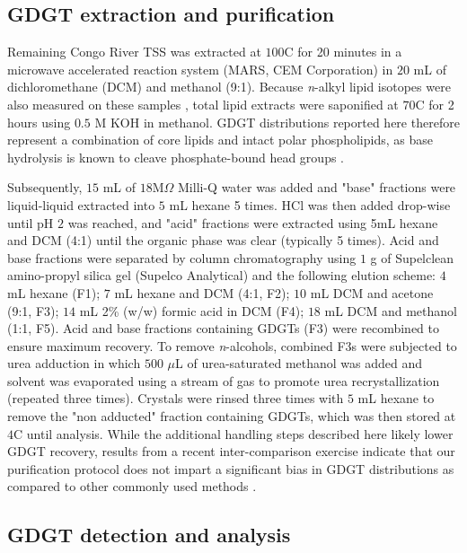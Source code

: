 \subsection{GDGT extraction and purification}

Remaining Congo River TSS was extracted at $100$\textdegree C for 20 minutes in a microwave accelerated reaction system (MARS, CEM Corporation) in $20$ mL of dichloromethane (DCM) and methanol (9:1). Because \textit{n}-alkyl lipid isotopes were also measured on these samples \citep{Hemingway:2016bq}, total lipid extracts were saponified at $70$\textdegree C for 2 hours using $0.5$ M KOH in methanol. GDGT distributions reported here therefore represent a combination of core lipids and intact polar phospholipids, as base hydrolysis is known to cleave phosphate-bound head groups \citep{Weijers:2011bn}.

Subsequently, $15$ mL of $18$M$\Omega$ Milli-Q water was added and "base" fractions were liquid-liquid extracted into $5$ mL hexane 5 times. HCl was then added drop-wise until pH $2$ was reached, and "acid" fractions were extracted using 5mL hexane and DCM (4:1) until the organic phase was clear (typically 5 times). Acid and base fractions were separated by column chromatography using $1$ g of Supelclean amino-propyl silica gel (Supelco Analytical) and the following elution scheme: $4$ mL hexane (F1); $7$ mL hexane and DCM (4:1, F2); $10$ mL DCM and acetone (9:1, F3); $14$ mL 2\% (w/w) formic acid in DCM (F4); $18$ mL DCM and methanol (1:1, F5). Acid and base fractions containing GDGTs (F3) were recombined to ensure maximum recovery. To remove \textit{n}-alcohols, combined F3s were subjected to urea adduction in which $500$ $\mu$L of urea-saturated methanol was added and solvent was evaporated using a stream of  gas to promote urea recrystallization (repeated three times). Crystals were rinsed three times with $5$ mL hexane to remove the "non adducted" fraction containing GDGTs, which was then stored at $4$\textdegree C until analysis. While the additional handling steps described here likely lower GDGT recovery, results from a recent inter-comparison exercise \citep{Schouten:2013hh} indicate that our purification protocol does not impart a significant bias in GDGT distributions as compared to other commonly used methods \citep[\textit{e.g.} the modified Bligh and Dyer method of][]{Pitcher:2009jd}.

\subsection{GDGT detection and analysis}


